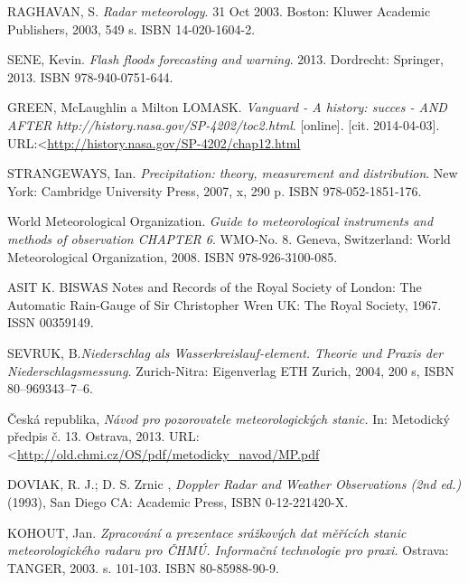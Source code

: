 \documentclass[a4paper,12pt]{article}
\renewcommand\baselinestretch{1.3}
\begin{document}
\newpage
\renewcommand\baselinestretch{1.2}
\selectfont
\renewcommand{\refname}{Použité zdroje}
\addcontentsline{toc}{section}{\refname}

\begin{thebibliography}{99}
\label{literatura}




RAGHAVAN, S. \textit {Radar meteorology}.
31 Oct 2003. Boston: Kluwer Academic Publishers, 2003, 549 s. ISBN 14-020-1604-2. 

SENE, Kevin. \textit {Flash floods forecasting and warning}.
2013. Dordrecht: Springer, 2013. ISBN 978-940-0751-644. 

GREEN, McLaughlin a Milton LOMASK. \textit {Vanguard - A history: succes - AND AFTER http://history.nasa.gov/SP-4202/toc2.html}.
[online]. [cit. 2014-04-03]. URL:\textless\url {http://history.nasa.gov/SP-4202/chap12.html}

STRANGEWAYS, Ian.  \textit {Precipitation: theory, measurement and distribution}.
New York: Cambridge University Press, 2007, x, 290 p. ISBN 978-052-1851-176. 

World Meteorological Organization. \textit{Guide to meteorological instruments and methods of observation CHAPTER 6}. WMO-No. 8. Geneva, Switzerland: World Meteorological Organization, 2008. ISBN 978-926-3100-085. 

ASIT K. BISWAS {Notes and Records of the Royal Society of London: The Automatic Rain-Gauge of Sir Christopher Wren} UK: The Royal Society, 1967. ISSN 00359149. 

SEVRUK, B.\textit{Niederschlag als Wasserkreislauf-element. Theorie und Praxis der Niederschlagsmessung.} 
Zurich-Nitra: Eigenverlag ETH Zurich,  2004, 200 s, ISBN 80–969343–7–6.

Česká republika, \textit{Návod pro pozorovatele meteorologických stanic.}
In: Metodický předpis č. 13. Ostrava, 2013. URL:\textless\url {http://old.chmi.cz/OS/pdf/metodicky_navod/MP.pdf}


DOVIAK, R. J.; D. S. Zrnic , \textit{Doppler Radar and Weather Observations (2nd ed.)}
(1993), San Diego CA: Academic Press, ISBN 0-12-221420-X.

KOHOUT, Jan. \textit{Zpracování a prezentace srážkových dat měřících stanic meteorologického radaru pro ČHMÚ. Informační technologie pro praxi.}
Ostrava: TANGER, 2003. s. 101-103. ISBN 80-85988-90-9.








\end{thebibliography}
\end{document}

